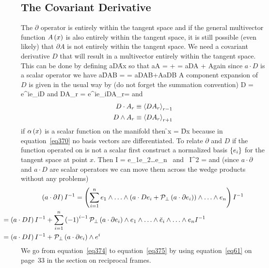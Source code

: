 \subsection{The Covariant Derivative}
The $\partial$ operator is entirely within the tangent space and if the general multivector function ${A}\left ( {x} \right )$ is also entirely within the tangent
space, it is still possible (even likely) that $\partial A$ is not entirely within the tangent space.  We need a covariant derivative $D$ that will
result in a multivector entirely within the tangent space.  This can be done by defining
\be
a\cdot D\f{A}{x} \equiv  {} 
\ee
so that
\be
 a\cdot\partial A = + = a\cdot DA + 
\ee
Again since $a\cdot D$ is a scalar operator we have
\be
 a\cdot \f{D}{AB} =  = \lp a\cdot DA\rp B+A\lp a\cdot DB\rp
\ee
A component expansion of $D$ is given in the usual way by (do not forget the summation convention)
\be
 D = e^{i}e_{i}\cdot D
\ee
and
\be
 DA_{r} = e^{i}\lp e_{i}\cdot DA_{r}\rp = 
\ee
and
\begin{align}
 D\cdot A_{r} \equiv \left < {DA_{r}} \right >_{r-1} \\
 D\wedge A_{r} \equiv \left < {DA_{r}} \right >_{r+1}
\end{align}
if ${\alpha}\left ( {x} \right )$ is a scalar function on the manifold then
\be\label{eq370}
 \partial\f{\alpha}{x} = D\f{\alpha}{x}
\ee
because in equation~\ref{eq370} no basis vectors are differentiated.  To relate $\partial$ and $D$ if the function operated on is 
not a scalar first construct a normalized basis $\left \{ {e_{i}} \right \}$ for the tangent space at point $x$.  Then
\be
	I = e_{1}\W e_{2}\W\dots\W e_{n} \mbox{ and } I^{2} = 
\ee 
and (since $a\cdot\partial$ and $a\cdot D$ are scalar operators we can move them across the wedge products without any problems)
\begin{align}
 \paren{a\cdot\partial I}I^{-1} &= \paren{\sum_{i=1}^{n}e_{1}\W\dots\W\paren{a\cdot De_{i}+\Prjp{a\cdot\partial e_{i}}}\W\dots\W e_{n}}I^{-1} \\
                                &\hspace{-1.5in}= \paren{a\cdot D I}I^{-1}+\sum_{i=1}^{n}\paren{-1}^{i-1}\Prjp{a\cdot\partial e_{i}}\W e_{1}\W\dots\W \breve{e}_{i}\W\dots\W e_{n}I^{-1} \label{eq374}\\
                                &\hspace{-1.5in}= \paren{a\cdot DI}I^{-1}+\Prjp{a\cdot\partial e_{i}}\W e^{i} \label{eq375}
\end{align}
We go from equation~\ref{eq374} to equation~\ref{eq375} by using equation~\ref{eq61} on page~33 in the section on reciprocal frames.

